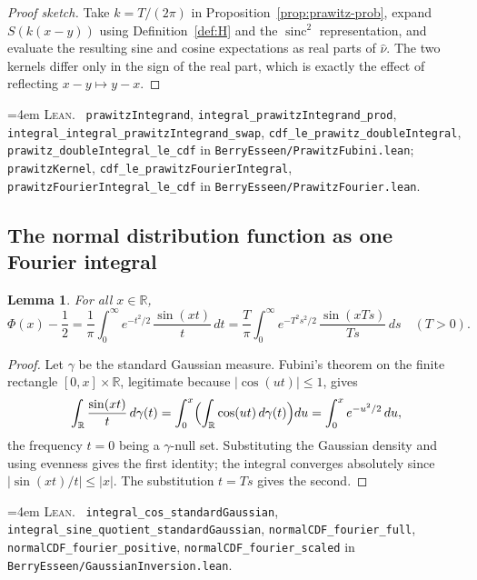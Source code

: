 \documentclass[10pt,a4paper]{article}
\theoremstyle{plain}
\newtheorem{lemma}[theorem]{Lemma}
\theoremstyle{definition}
\newcommand{\R}{\mathbb{R}}
\newcommand{\lean}[1]{\texttt{#1}}
\newcommand{\file}[1]{\texttt{#1}}
\DeclareMathOperator{\sinc}{sinc}
\newenvironment{leanref}%
  {\par\addvspace{3pt}\begingroup\sloppy\emergencystretch=4em
   \noindent\footnotesize\textsc{Lean.}\ \ignorespaces}%
  {\par\endgroup\addvspace{3pt}}
\begin{document}
\begin{proof}[Proof sketch]
Take $k=T/(2\pi)$ in Proposition~\ref{prop:prawitz-prob}, expand
$S(k(x-y))$ using Definition~\ref{def:H} and the $\sinc^2$ representation, and
evaluate the resulting sine and cosine expectations as real parts of
$\hat\nu$. The two kernels differ only in the sign of the real part, which is
exactly the effect of reflecting $x-y\mapsto y-x$.
\end{proof}

\begin{leanref}
\lean{prawitzIntegrand}, \lean{integral\_prawitzIntegrand\_prod},
\lean{integral\_integral\_prawitzIntegrand\_swap},
\lean{cdf\_le\_prawitz\_doubleIntegral},
\lean{prawitz\_doubleIntegral\_le\_cdf} in
\file{BerryEsseen/PrawitzFubini.lean};
\lean{prawitzKernel}, \lean{cdf\_le\_prawitzFourierIntegral},
\lean{prawitzFourierIntegral\_le\_cdf} in
\file{BerryEsseen/PrawitzFourier.lean}.
\end{leanref}

\subsection{The normal distribution function as one Fourier integral}

\begin{lemma}\label{lem:normal-fourier}
For all $x\in\R$,
\[
  \Phi(x)-\frac12 = \frac1\pi\int_0^\infty e^{-t^2/2}\,\frac{\sin(xt)}{t}\,dt
  = \frac{T}{\pi}\int_0^\infty e^{-T^2s^2/2}\,\frac{\sin(xTs)}{Ts}\,ds
  \quad (T>0).
\]
\end{lemma}

\begin{proof}
Let $\gamma$ be the standard Gaussian measure. Fubini's theorem on the finite
rectangle $[0,x]\times\R$, legitimate because $|\cos(ut)|\le1$, gives
\[
  \int_\R\frac{\sin(xt)}{t}\,d\gamma(t)
  = \int_0^x\Bigl(\int_\R\cos(ut)\,d\gamma(t)\Bigr)du
  = \int_0^x e^{-u^2/2}\,du ,
\]
the frequency $t=0$ being a $\gamma$-null set. Substituting the Gaussian
density and using evenness gives the first identity; the integral converges
absolutely since $|\sin(xt)/t|\le|x|$. The substitution $t=Ts$ gives the
second.
\end{proof}

\begin{leanref}
\lean{integral\_cos\_standardGaussian},
\lean{integral\_sine\_quotient\_standardGaussian},
\lean{normalCDF\_fourier\_full}, \lean{normalCDF\_fourier\_positive},
\lean{normalCDF\_fourier\_scaled} in
\file{BerryEsseen/GaussianInversion.lean}.
\end{leanref}
\end{document}
